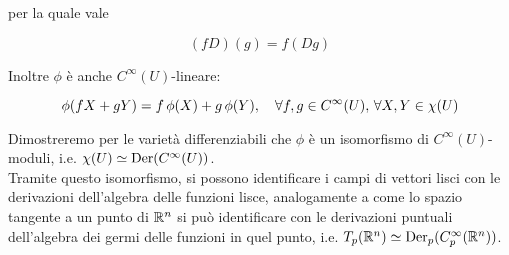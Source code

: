 per la quale vale

\begin{equation}
	(f D) (g) = f (D g)
\end{equation}

Inoltre $ \phi $ è anche $ C^{\infty}(U) $-lineare:

\begin{equation}
	\phi(f X + g Y) = f \, \phi(X) + g \, \phi(Y) \qcomma \forall f, g \in C^{\infty}(U), \, \forall X, Y \in \chi(U)
\end{equation}

Dimostreremo per le varietà differenziabili che $ \phi $ è un isomorfismo di $ C^{\infty}(U) $-moduli, i.e. $ \chi(U) \simeq \operatorname{Der}(C^{\infty}(U)) $.\\
Tramite questo isomorfismo, si possono identificare i campi di vettori lisci con le derivazioni dell'algebra delle funzioni lisce, analogamente a come lo spazio tangente a un punto di $ \mathbb{R}^{n} $ si può identificare con le derivazioni puntuali dell'algebra dei germi delle funzioni in quel punto, i.e. $ T_{p}(\mathbb{R}^{n}) \simeq \operatorname{Der}_{p}(C_{p}^{\infty}(\mathbb{R}^{n})) $.
